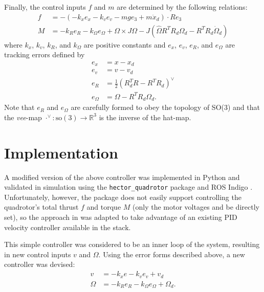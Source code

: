 \documentclass[paper=letter, fontsize=11pt]{scrartcl} %
\numberwithin{equation}{section} %
\numberwithin{figure}{section} %
\numberwithin{table}{section} %
\begin{document}
Finally, the control inputs $f$ and $m$ are determined by the following relations:
\begin{align}
  f &= -(-k_x e_x - k_v e_v -m g e_3 + m \ddot{x}_d) \cdot Re_3 \\
  M &= -k_R e_R - k_{\Omega} e_{\Omega} + \Omega \times J \Omega
       - J(\hat{\Omega}R^TR_d \Omega_d - R^TR_d \dot{\Omega}_d)
\end{align}
where $k_x$, $k_v$, $k_R$, and $k_{\Omega}$ are positive constants and
$e_x$, $e_v$, $e_R$, and $e_{\Omega}$ are tracking errors defined by
\begin{align}
  e_x &= x - x_d \\
  e_v &= v - v_d \\
  e_R &= \frac{1}{2}(R_d^TR - R^TR_d)^{\vee} \\
  e_{\Omega} &= \Omega - R^TR_d \Omega_d.
\end{align}
Note that $e_R$ and $e_{\Omega}$ are carefully formed to obey the topology of
SO(3) and that the \textit{vee}-map $\cdot^{\vee}: \textrm{so}(3) \rightarrow \mathbb{R}^3$ is the
inverse of the hat-map.


\section{Implementation}
A modified version of the above controller was implemented in Python and validated
in simulation using the \texttt{hector\_quadrotor} package \cite{2012simpar_meyer}
and ROS Indigo \cite{quigley2009ros}.
Unfortunately, however, the package does not easily support controlling the quadrotor's total
thrust $f$ and torque $M$ (only the motor voltages and be directly set), so
the approach in \cite{lee2010geometric} was adapted
to take advantage of an existing PID velocity controller available in the
stack.

This simple controller was considered to be an inner loop
of the system, resulting in new control inputs $v$ and $\Omega$. Using the
error forms described above, a new controller was devised:
\begin{align}
  v &= -k_x e - k_v e_v + v_d \\
  \Omega &= -k_R e_R - k_{\Omega} e_{\Omega} + \Omega_d.
\end{align}
\end{document}
